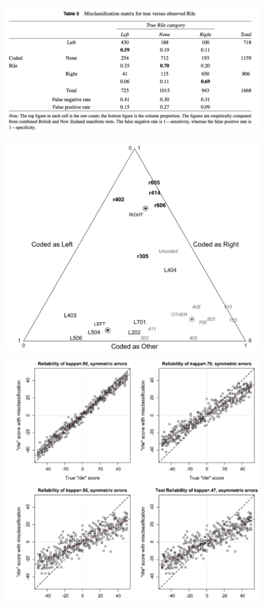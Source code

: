 \documentclass{mediumfoils}
\begin{document}
\centerline{\includegraphics[scale=.9]{pictures/slava-rile3}}


\centerline{\includegraphics[scale=.7]{pictures/slava-rile2}}


\centerline{\includegraphics[scale=.6]{pictures/slava-rile}}
\end{document}
